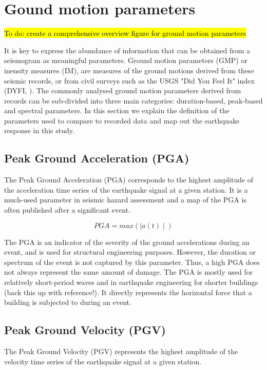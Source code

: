 \documentclass[../Text/00main.tex]{subfiles}
\begin{document}
\section{Gound motion parameters}

\hl{To do: create a comprehensive overview figure for ground motion parameters}

It is key to express the abundance of information that can be obtained from a seismogram as meaningful parameters. Ground motion parameters (GMP) or inensity measures (IM), are measures of the ground motions derived from these seismic records, or from civil surveys such as the USGS "Did You Feel It" index (DYFI, \cite{atkinson2007did}). The commonly analysed ground motion parameters derived from records can be sub-divided into three main categories: duration-based, peak-based and spectral parameters. In this section we explain the definition of the parameters used to compare to recorded data and map out the earthquake response in this study. 

\subsection{Peak Ground Acceleration (PGA)}

The Peak Ground Acceleration (PGA) corresponds to the highest amplitude of the acceleration time series of the earthquake signal at a given station. It is a much-used parameter in seismic hazard assessment and a map of the PGA is often published after a significant event.

\begin{equation}
    PGA = max(\mid a(t) \mid)
\end{equation}

The PGA is an indicator of the severity of the ground accelerations during an event, and is used for structural engineering purposes. However, the duration or spectrum of the event is not captured by this parameter. Thus, a high PGA does not always represent the same amount of damage. The PGA is mostly used for relatively short-period waves and in earthquake engineering for shorter buildings (back this up with reference!). It directly represents the horizontal force that a building is subjected to during an event. 

\subsection{Peak Ground Velocity (PGV)}

The Peak Ground Velocity (PGV) represents the highest amplitude of the velocity time series of the earthquake signal at a given station. 
\end{document}
